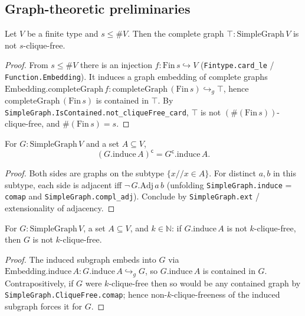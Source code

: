 \subsection{Graph-theoretic preliminaries}

\begin{lemma}
    \label{lem:top-not-cliquefree}
    \leanok
    Let $V$ be a finite type and $s \le \#V$. Then the complete graph
    $\top : \mathrm{SimpleGraph}\, V$ is not $s$-clique-free.
\end{lemma}
\begin{proof}
    From $s \le \#V$ there is an injection $f : \mathrm{Fin}\, s \hookrightarrow V$
    (\texttt{Fintype.card\_le} / \texttt{Function.Embedding}). It induces a graph
    embedding of complete graphs
    $\mathrm{Embedding.completeGraph}\, f : \mathrm{completeGraph}\,(\mathrm{Fin}\,s)
    \hookrightarrow_g \top$, hence $\mathrm{completeGraph}\,(\mathrm{Fin}\,s)$ is
    contained in $\top$. By \texttt{SimpleGraph.IsContained.not\_cliqueFree\_card},
    $\top$ is not $(\#(\mathrm{Fin}\,s))$-clique-free, and
    $\#(\mathrm{Fin}\,s) = s$.
\end{proof}

\begin{lemma}
    \label{lem:induce-compl}
    \leanok
    For $G : \mathrm{SimpleGraph}\, V$ and a set $A \subseteq V$,
    \[
        (G.\mathrm{induce}\, A)^{\mathsf c} = G^{\mathsf c}.\mathrm{induce}\, A .
    \]
\end{lemma}
\begin{proof}
    Both sides are graphs on the subtype $\{x \mathbin{//} x \in A\}$. For distinct
    $a, b$ in this subtype, each side is adjacent iff $\neg\, G.\mathrm{Adj}\, a\, b$
    (unfolding \texttt{SimpleGraph.induce} = \texttt{comap} and
    \texttt{SimpleGraph.compl\_adj}). Conclude by \texttt{SimpleGraph.ext} /
    extensionality of adjacency.
\end{proof}

\begin{lemma}
    \label{lem:induce-lift}
    \leanok
    For $G : \mathrm{SimpleGraph}\, V$, a set $A \subseteq V$, and $k \in \mathbb{N}$:
    if $G.\mathrm{induce}\, A$ is not $k$-clique-free, then $G$ is not
    $k$-clique-free.
\end{lemma}
\begin{proof}
    The induced subgraph embeds into $G$ via
    $\mathrm{Embedding.induce}\, A : G.\mathrm{induce}\, A \hookrightarrow_g G$, so
    $G.\mathrm{induce}\, A$ is contained in $G$. Contrapositively, if $G$ were
    $k$-clique-free then so would be any contained graph by
    \texttt{SimpleGraph.CliqueFree.comap}; hence non-$k$-clique-freeness of the
    induced subgraph forces it for $G$.
\end{proof}

